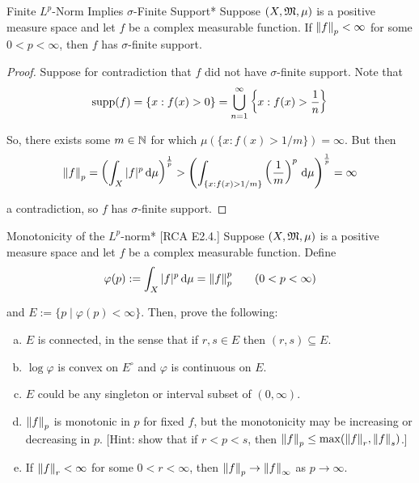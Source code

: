 \begin{problem}{Finite \(L^p\)-Norm Implies \(\sigma\)-Finite Support}*
    Suppose \((X, \mathfrak{M}, \mu)\) is a positive measure space and let \(f\) be a complex measurable function. If \(\norm{f}_p < \infty\) for some \(0 < p < \infty\), then \(f\) has \(\sigma\)-finite support. 
\end{problem}

\begin{proof}
    Suppose for contradiction that \(f\) did not have \(\sigma\)-finite support. Note that 
    \[
        \operatorname{supp}(f) = \{x : f(x) > 0 \} = \bigcup_{n=1}^\infty \left\{ x : f(x) > \frac{1}{n} \right\}
    \]

    So, there exists some \(m \in \mathbb{N}\) for which \(\mu(\{x : f(x) > 1/m\}) = \infty\). But then
    \[
        \norm{f}_p = \left( \int_X |f|^p \, \mathrm{d}\mu \right)^{\frac{1}{p}}
        > \left( \int_{\{x : f(x) > 1/m\}} \left(\frac{1}{m}\right)^p \, \mathrm{d}\mu \right)^{\frac{1}{p}}
        = \infty
    \]

    a contradiction, so \(f\) has \(\sigma\)-finite support. 
\end{proof}


\begin{problem}{Monotonicity of the \(L^p\)-norm}*
    [RCA E2.4.] Suppose \((X, \mathfrak{M}, \mu)\) is a positive measure space and let \(f\) be a complex measurable function. Define 
    \[
        \varphi(p) := \int_X |f|^p \, \mathrm{d}\mu = \norm{f}_p^p
        \qquad (0 < p < \infty) 
    \]

    and \(E := \{ p \mid \varphi(p) < \infty\}\). Then, prove the following: 
    \begin{enumerate}[(a)]
        \itemsep0em
        \item \(E\) is connected, in the sense that if \(r, s \in E\) then \((r, s) \subseteq E\). 
        \item \(\log \varphi\) is convex on \(E^\circ\) and \(\varphi\) is continuous on \(E\). 
        \item \(E\) could be any singleton or interval subset of \((0, \infty)\). 
        \item \(\norm{f}_p\) is monotonic in \(p\) for fixed \(f\), but the monotonicity may be increasing or decreasing in \(p\). [Hint: show that if \(r < p < s\), then \(\norm{f}_p \leq \max(\norm{f}_r, \norm{f}_s)\).]
        \item If \(\norm{f}_r < \infty\) for some \(0 < r < \infty\), then \(\norm{f}_p \to \norm{f}_\infty\) as \(p \to \infty\). 
    \end{enumerate}
\end{problem}

